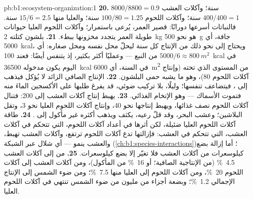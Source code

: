 \begin{solution}{pb:b1:ecosystem-organization:1}
\textbf{20.}  $8000/8800 = 0.9$ سنة؛ وآكلات العشب $400/400 =
1$ سنة؛ وآكلات اللحوم $100/80 = 1.25$ سنة؛ والعليا منها $15/6 =
2.5$ سنة. فالنباتات أسرعها دورانًا:  قصير العمر، يُرعى
باستمرار؛ وآكلات اللحوم العليا حيوانات طويلة العمر يتجدد مخزونها
ببطء.
\textbf{21.} بلشون كتلته \qty{2}{kg} هو نحو \qty{500}{g} جافة، أي
\qty{5000}{kcal}، ويحتاج إلى نحو ذلك من الإنتاج كل سنة ليحلّ
محل نفسه ومحل صغاره: أي $5000/6 \approx \qty{800}{m^2}$ من
النبع --- وعمليًا أكثر بكثير، إذ يتنفس أيضًا: فعند
\qty{100}{kcal} في اليوم يكون مدخوله \qty{36500}{kcal} في السنة، أي
\qty{6000}{m^2} من المستوى الذي تحته (وإنتاج آكلات اللحوم
\qty{80}{})، وهو ما يشبه حمى البلشون.
\textbf{22.} الإنتاج الصافي الزائد لا يُؤكل فيذهب إلى
، فيتضاعف تنفسها؛ وليلًا، بلا
تركيب ضوئي، قد يفرغ طلبها على الأكسجين الماءَ منه
فتموت الأسماك --- وهو الإتخام الغذائي.
\textbf{23.} يهبط إنتاج آكلات العشب إلى \qty{200}{}: فتنال آكلات اللحوم
نصف غذائها، ويهبط إنتاجها نحو \qty{40}{}، وإنتاج آكلات اللحوم
العليا نحو 3، وتقل البلاشين؛ وعشب البحر، وقد قلّ رعيه،
يكثف ويذهب أكثره غير مأكول إلى .
\textbf{24.} طاقة آكلات اللحوم العليا ضئيلة، لكن أثرها
في أعداد آكلات اللحوم، التي تتحكم في آكلات العشب، التي
تتحكم في العشب: فإزالتها تدع آكلات اللحوم ترتفع، وآكلات
العشب تهبط، والعشب ينمو --- أي شلال عبر الشبكة
(\cref{ch:b1:species-interactions})؛ أما إزالة بضع كيلوسعرات من
آكلات العشب فلا تغيّر إلا بضع كيلوسعرات.
\textbf{25.} من  إلى آكلات العشب \qty{4.5}{\%} (من الإنتاجية الصافية؛ أو \qty{16}{\%}
من المأكول)، ومن آكلات العشب إلى آكلات اللحوم \qty{20}{\%}، ومن آكلات اللحوم
إلى العليا منها \qty{7.5}{\%}؛ ومن ضوء الشمس إلى الإنتاج الإجمالي
\qty{1.2}{\%}؛ وبضعة أجزاء من مليون من ضوء الشمس تنتهي في آكلات
اللحوم العليا.
\end{solution}
